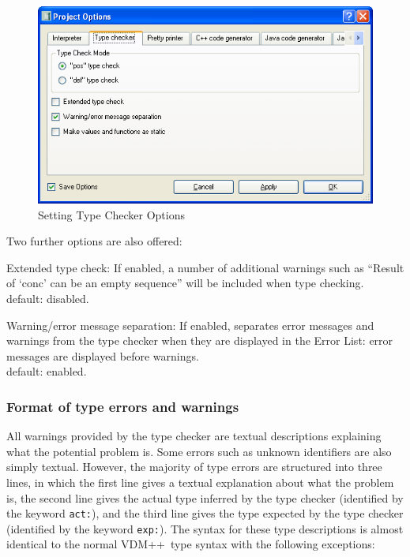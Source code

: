 \documentclass[\pformat,12pt]{article}
\newcommand{\vdmslpp}{VDM++}
\newcommand{\guicmd}[1]{{\sf #1}}
\begin{document}
\begin{figure}[tbh]
\begin{center}
\includegraphics[width=12cm]{tcOptions-ppENG.png}
\caption{Setting Type Checker Options}
\label{fig:opttc}
\end{center}
\end{figure}

Two further options are also offered:

\begin{list}{}{}
\item[{\sf Extended type check}:] If enabled, a number of additional
  warnings such as ``Result of `conc' can be an empty sequence'' will
  be included when type checking. \\
  default: disabled.

\item[\textsf{Warning/error message separation}:] If enabled,
  separates error messages and warnings from the type checker when
  they are displayed in the \guicmd{Error List}: error messages are
  displayed before warnings.\\
  default: enabled. 

\end{list}


\subsubsection{Format of type errors and warnings}\label{subsub:tcerr}

All warnings provided by the type checker are textual descriptions
explaining what the potential problem is. Some errors such as unknown
identifiers are also simply textual. However, the majority of type
errors are structured into three lines, in which the first line gives
a textual explanation about what the problem is, the second line gives
the actual type inferred by the type checker (identified by the keyword
\texttt{act:}), and the third line gives the type expected by the type
checker (identified by the keyword \texttt{exp:}). The syntax for these
type descriptions is almost identical to the normal \vdmslpp\ type syntax
with the following exceptions:
\end{document}
